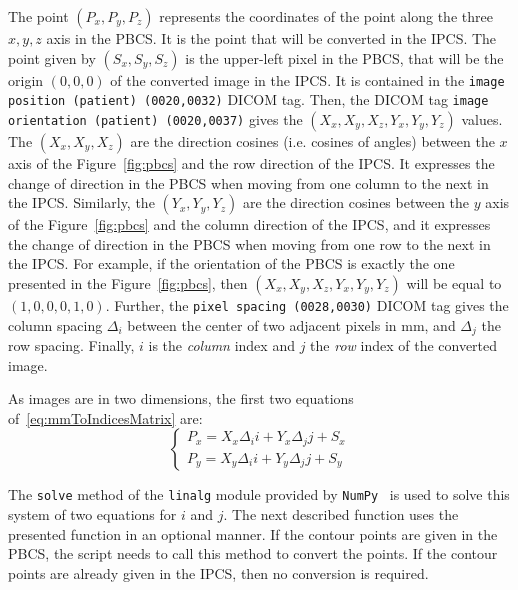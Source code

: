 The point $(P_x, P_y, P_z)$ represents the coordinates of the point along the three $x,y,z$ axis in the PBCS. It is the point that will be converted in the IPCS. The point given by $(S_x, S_y, S_z)$ is the upper-left pixel in the PBCS, that will be the origin $(0,0,0)$ of the converted image in the IPCS. It is contained in the \texttt{image position (patient) (0020,0032)} DICOM tag. Then, the DICOM tag \texttt{image orientation (patient) (0020,0037)} gives the $(X_x, X_y, X_z, Y_x, Y_y, Y_z)$ values. The $(X_x, X_y, X_z)$ are the direction cosines (i.e. cosines of angles) between the $x$ axis of the Figure~\ref{fig:pbcs} and the row direction of the IPCS. It expresses the change of direction in the PBCS when moving from one column to the next in the IPCS. Similarly, the $(Y_x, Y_y, Y_z)$ are the direction cosines between the $y$ axis of the Figure~\ref{fig:pbcs} and the column direction of the IPCS, and it expresses the change of direction in the PBCS when moving from one row to the next in the IPCS. For example, if the orientation of the PBCS is exactly the one presented in the Figure~\ref{fig:pbcs}, then $(X_x, X_y, X_z, Y_x, Y_y, Y_z)$ will be equal to $(1,0,0,0,1,0)$. Further, the \texttt{pixel spacing (0028,0030)} DICOM tag gives the column spacing $\Delta_i$ between the center of two adjacent pixels in mm, and $\Delta_j$ the row spacing. Finally, $i$ is the \emph{column} index and $j$ the \emph{row} index of the converted image.

As images are in two dimensions, the first two equations of~\eqref{eq:mmToIndicesMatrix} are:
\begin{equation}
  \label{eq:mmToIndicesAlgebra}
  \begin{cases}
    P_x = X_x \Delta_i i + Y_x \Delta_j j + S_x \\
    P_y = X_y \Delta_i i + Y_y \Delta_j j + S_y
  \end{cases}
\end{equation}

The \texttt{solve} method of the \texttt{linalg} module provided by \texttt{NumPy}~\cite{harris_array_2020} is used to solve this system of two equations for $i$ and $j$. The next described function uses the presented function in an optional manner. If the contour points are given in the PBCS, the script needs to call this method to convert the points. If the contour points are already given in the IPCS, then no conversion is required.


